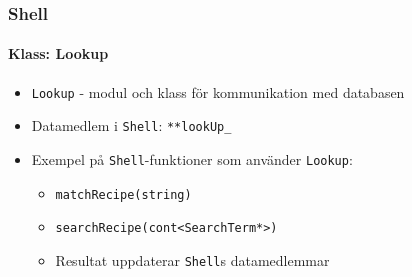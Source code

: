 \begin{frame}
  \frametitle{Shell}
  \framesubtitle{Klass: Lookup}
  \begin{itemize}
  \item \texttt{Lookup} - modul och klass för kommunikation med databasen
  \item<2-> Datamedlem i \texttt{Shell}: \texttt{**lookUp\_}
  \item<3-> Exempel på \texttt{Shell}-funktioner som använder \texttt{Lookup}:
    \begin{itemize}
    \item \texttt{matchRecipe(string)}
    \item \texttt{searchRecipe(cont<SearchTerm*>)}
    \item Resultat uppdaterar \texttt{Shell}s datamedlemmar
    \end{itemize}
  \end{itemize}
\end{frame}

